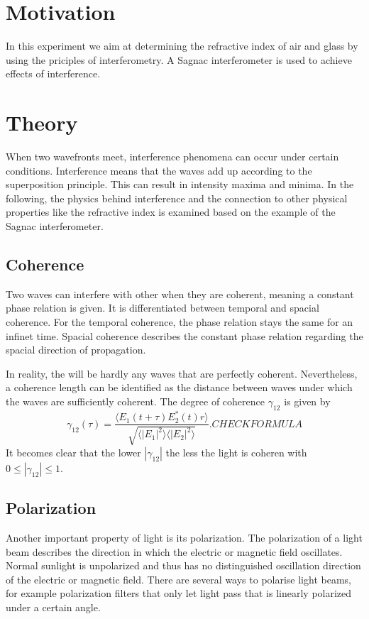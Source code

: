 \section{Motivation}
\label{sec:Motivation}
In this experiment we aim at determining the refractive index of air and glass by using the priciples of interferometry. A Sagnac interferometer is used to achieve
effects of interference.

\section{Theory}
\label{sec:Theory}
When two wavefronts meet, interference phenomena can occur under certain conditions. Interference means that the waves add up according to the superposition principle. This can result in
intensity maxima and minima.
In the following, the physics behind interference and the connection to other physical properties like the refractive index is examined based on the example of the Sagnac interferometer.

\subsection{Coherence}
\label{sec:Coherence}
Two waves can interfere with other when they are coherent, meaning a constant phase relation is given. It is differentiated between temporal and spacial coherence. For the temporal
coherence, the phase relation stays the same for an infinet time. Spacial coherence describes the constant phase relation regarding the spacial direction of propagation.

In reality, the will be hardly any waves that are perfectly coherent. Nevertheless, a coherence length can be identified as the distance between waves under which the waves are sufficiently
coherent. The degree of coherence $\gamma_{12}$ is given by
\begin{equation*}
    \gamma_{12}(\tau)= \frac{\langle E_1(t+\tau)E^{*}_2(t) r \rangle}{\sqrt{\langle|E_1|^2\rangle\langle|E_2|^2\rangle}}. CHECK FORMULA
\end{equation*}
It becomes clear that the lower $|\gamma_{12}|$ the less the light is coheren with $0≤|\gamma_{12}|≤1$.

\subsection{Polarization}
\label{sec:Polarization}
Another important property of light is its polarization. The polarization of a light beam describes the direction in which the electric or magnetic field oscillates. Normal sunlight 
is unpolarized and thus has no distinguished oscillation direction of the electric or magnetic field. There are several ways to polarise light beams, for example polarization filters that only
let light pass that is linearly polarized under a certain angle.

